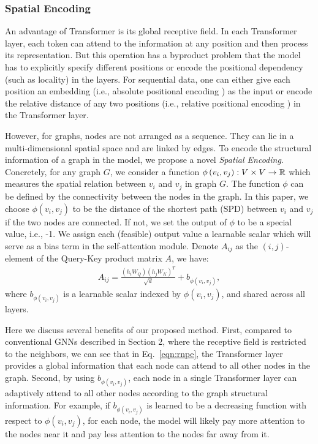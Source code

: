\documentclass{article}
\begin{document}
\subsubsection{Spatial Encoding} 
An advantage of Transformer is its global receptive field. In each Transformer layer, each token can attend to the information at any position and then process its representation. But this operation has a byproduct problem that the model has to explicitly specify different positions or encode the positional dependency (such as locality) in the layers. For sequential data, one can either give each position an embedding (i.e., absolute positional encoding \cite{vaswani2017attention}) as the input or encode the relative distance of any two positions (i.e., relative positional encoding \cite{raffel2019exploring,shaw2018self}) in the Transformer layer. 

However, for graphs, nodes are not arranged as a sequence. They can lie in a multi-dimensional spatial space and are linked by edges. To encode the structural information of a graph in the model, we propose a novel \emph{Spatial Encoding}. Concretely, for any graph $G$, we consider a function $\phi\left(v_i, v_j\right):V\times V\to\mathbb{R}$ which measures the spatial relation between $v_i$ and $v_j$ in graph $G$. The function $\phi$ can be defined by the connectivity between the nodes in the graph. In this paper, we choose $\phi(v_i,v_j)$ to be the distance of the shortest path (SPD) between $v_i$ and $v_j$ if the two nodes are connected. If not, we set the output of $\phi$ to be a special value, i.e., -1. We assign each (feasible) output value a learnable scalar which will serve as a bias term in the self-attention module. Denote $A_{ij}$ as the $(i,j)$-element of the Query-Key product matrix $A$, we have:
\begin{align}
\label{eqn:rnpe}
    A_{ij}=\frac{(h_iW_{Q})(h_jW_{K})^T}{\sqrt{d}}  + b_{\phi(v_i,v_j)},
\end{align}
where $b_{\phi(v_i,v_j)}$ is a learnable scalar indexed by $\phi(v_i,v_j)$, and shared across all layers.

Here we discuss several benefits of our proposed method. First,  compared to conventional GNNs described in Section 2, where the receptive field is restricted to the neighbors, we can see that in Eq.~\eqref{eqn:rnpe}, the Transformer layer provides a global information that each node can attend to all other nodes in the graph. Second, by using $b_{\phi(v_i,v_j)}$, each node in a single Transformer layer can adaptively attend to all other nodes according to the graph structural information. For example, if $b_{\phi(v_i,v_j)}$ is learned to be a decreasing function with respect to $\phi(v_i,v_j)$,  for each node, the model will likely pay more attention to the nodes near it and pay less attention to the nodes far away from it.
\end{document}

